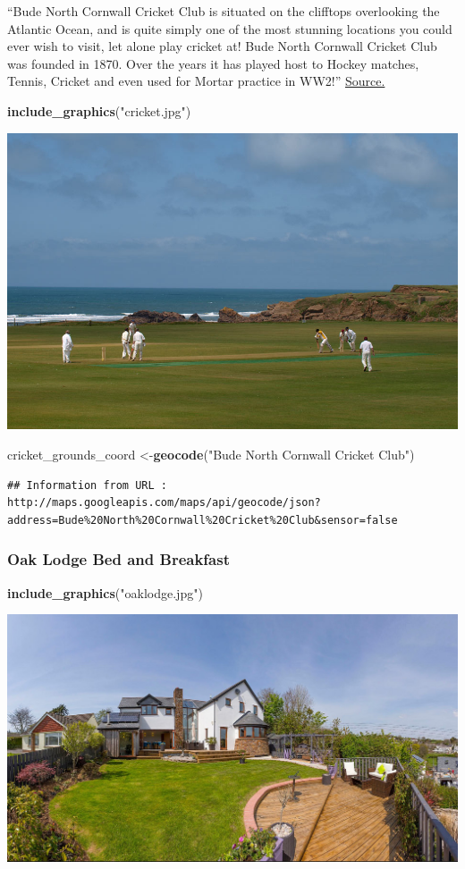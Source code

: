 \documentclass[]{article}
\newenvironment{Shaded}{\begin{snugshade}}{\end{snugshade}}
\newcommand{\KeywordTok}[1]{\textcolor[rgb]{0.13,0.29,0.53}{\textbf{#1}}}
\newcommand{\NormalTok}[1]{#1}
\newcommand{\StringTok}[1]{\textcolor[rgb]{0.31,0.60,0.02}{#1}}
\begin{document}
``Bude North Cornwall Cricket Club is situated on the clifftops
overlooking the Atlantic Ocean, and is quite simply one of the most
stunning locations you could ever wish to visit, let alone play cricket
at! Bude North Cornwall Cricket Club was founded in 1870. Over the years
it has played host to Hockey matches, Tennis, Cricket and even used for
Mortar practice in WW2!''
\href{http://budecc.play-cricket.com/}{Source.}

\begin{Shaded}
\begin{Highlighting}[]
\KeywordTok{include_graphics}\NormalTok{(}\StringTok{"cricket.jpg"}\NormalTok{)}
\end{Highlighting}
\end{Shaded}

\includegraphics[width=0.25\linewidth]{cricket}

\begin{Shaded}
\begin{Highlighting}[]
\NormalTok{cricket_grounds_coord <-}\KeywordTok{geocode}\NormalTok{(}\StringTok{"Bude North Cornwall Cricket Club"}\NormalTok{)}
\end{Highlighting}
\end{Shaded}

\begin{verbatim}
## Information from URL : http://maps.googleapis.com/maps/api/geocode/json?address=Bude%20North%20Cornwall%20Cricket%20Club&sensor=false
\end{verbatim}

\hypertarget{oak-lodge-bed-and-breakfast}{%
\subsubsection{Oak Lodge Bed and
Breakfast}\label{oak-lodge-bed-and-breakfast}}

\begin{Shaded}
\begin{Highlighting}[]
\KeywordTok{include_graphics}\NormalTok{(}\StringTok{"oaklodge.jpg"}\NormalTok{)}
\end{Highlighting}
\end{Shaded}

\includegraphics[width=0.25\linewidth]{oaklodge}
\end{document}
